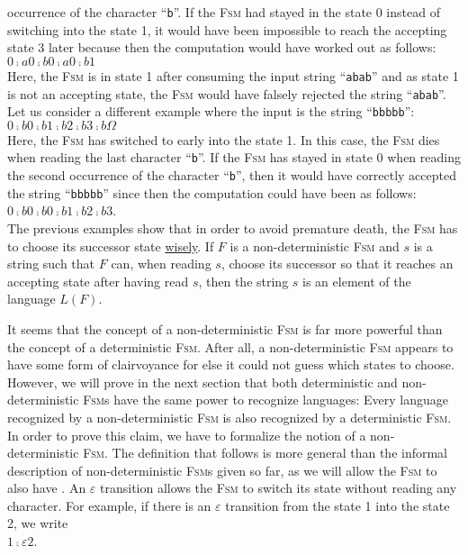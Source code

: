 occurrence of the character ``\texttt{b}''.  If the \textsc{Fsm} had stayed in the state 0 instead
of switching into the state 1, it would have been impossible to reach the accepting state 3 later
because then the computation would have worked out as follows:
\\[0.2cm]
\hspace*{1.3cm}
$0 \comp{a} 0 \comp{b} 0 \comp{a} 0 \comp{b} 1$
\\[0.2cm] 
Here, the \textsc{Fsm} is in state 1 after consuming the input string ``\texttt{abab}'' and as state
1 is not an accepting state, the \textsc{Fsm} would have falsely rejected the string ``\texttt{abab}''.
Let us consider a different example where the input is the string ``\texttt{bbbbb}'':
\\[0.2cm]
\hspace*{1.3cm}
$0 \comp{b} 0 \comp{b} 1 \comp{b} 2 \comp{b} 3 \comp{b} \Omega$
\\[0.2cm]
Here, the \textsc{Fsm} has switched to early into the state 1.  In this case, the \textsc{Fsm} dies
when reading the last character ``\texttt{b}''.  If the \textsc{Fsm} has stayed in state 0 when reading the second
occurrence of the character ``\texttt{b}'', then it would have correctly accepted the string
``\texttt{bbbbb}'' since then the computation could have been as follows:
\\[0.2cm]
\hspace*{1.3cm}
$0 \comp{b} 0 \comp{b} 0 \comp{b} 1 \comp{b} 2 \comp{b} 3$.
\\[0.2cm]
The previous examples show that in order to avoid premature death, the \textsc{Fsm} has to choose
its successor state
\href{http://mygeekwisdom.com/2013/06/15/he-chose-poorly-and-you-have-chosen-wisely/}{wisely}.  
If $F$ is a non-deterministic \textsc{Fsm} and $s$ is a string such that $F$ can, when reading $s$,
choose its successor so that it reaches an accepting state after having read $s$, then the string
$s$ is an element of the language $L(F)$.

It seems that the concept of a non-deterministic \textsc{Fsm} is far more powerful than the 
concept of a deterministic \textsc{Fsm}.  After all, a non-deterministic \textsc{Fsm} appears to
have some form of clairvoyance for else it could not guess which states to choose.  However, we will
prove in the 
next section that both deterministic and non-deterministic \textsc{Fsm}s have the same power to
recognize languages:  Every language recognized by a non-deterministic \textsc{Fsm} is also
recognized by a deterministic \textsc{Fsm}.  In order to prove this claim, we have to
formalize the notion of a non-deterministic \textsc{Fsm}.  The definition that follows is more
general than the informal description of non-deterministic \textsc{Fsm}s given so far, as we will
allow the \textsc{Fsm} to also have  .  An $\varepsilon$ transition
allows the \textsc{Fsm} to switch its state without reading any character.  For example, if there is
an $\varepsilon$ transition from the state 1 into the state 2, we write
\\[0.2cm]
\hspace*{1.3cm}
$1 \comp{\varepsilon} 2$.


